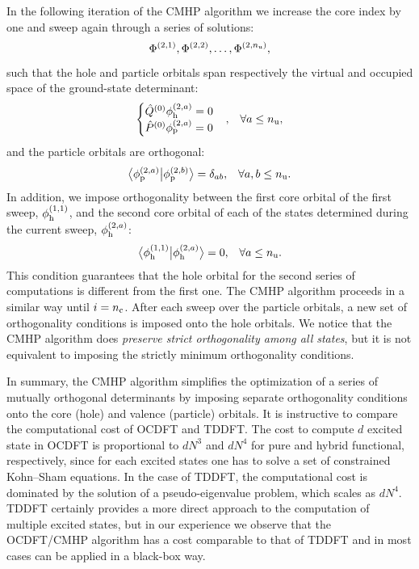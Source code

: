 \documentclass{article}
\begin{document}
In the following iteration of the CMHP algorithm we increase the core index by one and sweep again through a series of solutions:
\begin{equation}
\Phi^{(2,1)}, \Phi^{(2,2)}, \ldots, \Phi^{(2,n_{\rm u})},
\end{equation}
such that the hole and particle orbitals span respectively the virtual and occupied space of the ground-state determinant:
\begin{align}
\begin{cases}
\hat{Q}^{(0)}\phi_{\rm h}^{(2,a)}= 0\\
\hat{P}^{(0)}\phi_{\rm p}^{(2,a)}= 0
\end{cases} &,&\forall a \leq n_{\rm u},
\end{align}
and the particle orbitals are orthogonal:
\begin{align}
\braket[1]{\phi^{(2,a)}_{\rm p}}{\phi^{(2,b)}_{\rm p}} &= \delta_{ab},&\forall a,b \leq n_{\rm u}.
\end{align}
In addition, we impose orthogonality between the first core orbital of the first sweep, $\phi^{(1,1)}_{\rm h}$, and the second core orbital of each of the states determined during the current sweep, $\phi^{(2,a)}_{\rm h}$:
\begin{align}
\braket[1]{\phi^{(1,1)}_{\rm h}}{\phi^{(2,a)}_{\rm h}} &=0,&\forall a \leq n_{\rm u}.
\end{align}
This condition guarantees that the hole orbital for the second series of computations is different from the first one.
The CMHP algorithm proceeds in a similar way until $i = n_{\rm c}$.  After each sweep over the particle orbitals, a new set of orthogonality conditions is imposed onto the hole orbitals.
We notice that the CMHP algorithm does \textit{preserve strict orthogonality among all states}, but it is not equivalent to imposing the strictly minimum orthogonality conditions.

In summary, the CMHP algorithm simplifies the optimization of a series of mutually orthogonal determinants by imposing separate orthogonality conditions onto the core (hole) and valence (particle) orbitals.
It is instructive to compare the computational cost of OCDFT and TDDFT.
The cost to compute $d$ excited state in OCDFT is proportional to $d N^3$ and $d N^4$ for pure and hybrid functional, respectively, since for each excited states one has to solve a set of constrained Kohn--Sham equations.
In the case of TDDFT, the computational cost is dominated by the solution of a pseudo-eigenvalue problem, which scales as $d N^4$.
TDDFT certainly provides a more direct approach to the computation of multiple excited states, but in our experience we observe that the OCDFT/CMHP algorithm has a cost comparable to that of TDDFT and in most cases can be applied in a black-box way.
\end{document}

